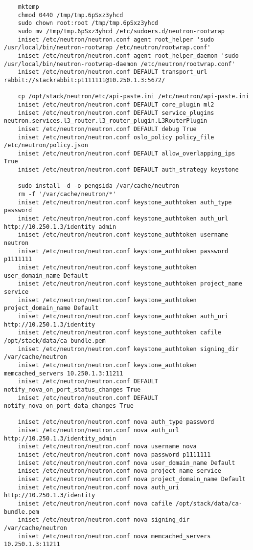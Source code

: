 \documentclass[a4paper,left=1.5cm,right=1.5cm,11pt]{article}
\begin{document}
\begin{lstlisting}
	mktemp
	chmod 0440 /tmp/tmp.6pSxz3yhcd
	sudo chown root:root /tmp/tmp.6pSxz3yhcd
	sudo mv /tmp/tmp.6pSxz3yhcd /etc/sudoers.d/neutron-rootwrap
	iniset /etc/neutron/neutron.conf agent root_helper 'sudo /usr/local/bin/neutron-rootwrap /etc/neutron/rootwrap.conf'
	iniset /etc/neutron/neutron.conf agent root_helper_daemon 'sudo /usr/local/bin/neutron-rootwrap-daemon /etc/neutron/rootwrap.conf'
	iniset /etc/neutron/neutron.conf DEFAULT transport_url rabbit://stackrabbit:p1111111@10.250.1.3:5672/

	cp /opt/stack/neutron/etc/api-paste.ini /etc/neutron/api-paste.ini
	iniset /etc/neutron/neutron.conf DEFAULT core_plugin ml2
	iniset /etc/neutron/neutron.conf DEFAULT service_plugins neutron.services.l3_router.l3_router_plugin.L3RouterPlugin
	iniset /etc/neutron/neutron.conf DEFAULT debug True
	iniset /etc/neutron/neutron.conf oslo_policy policy_file /etc/neutron/policy.json
	iniset /etc/neutron/neutron.conf DEFAULT allow_overlapping_ips True
	iniset /etc/neutron/neutron.conf DEFAULT auth_strategy keystone

	sudo install -d -o pengsida /var/cache/neutron
	rm -f '/var/cache/neutron/*'
	iniset /etc/neutron/neutron.conf keystone_authtoken auth_type password
	iniset /etc/neutron/neutron.conf keystone_authtoken auth_url http://10.250.1.3/identity_admin
	iniset /etc/neutron/neutron.conf keystone_authtoken username neutron
	iniset /etc/neutron/neutron.conf keystone_authtoken password p1111111
	iniset /etc/neutron/neutron.conf keystone_authtoken user_domain_name Default
	iniset /etc/neutron/neutron.conf keystone_authtoken project_name service
	iniset /etc/neutron/neutron.conf keystone_authtoken project_domain_name Default
	iniset /etc/neutron/neutron.conf keystone_authtoken auth_uri http://10.250.1.3/identity
	iniset /etc/neutron/neutron.conf keystone_authtoken cafile /opt/stack/data/ca-bundle.pem
	iniset /etc/neutron/neutron.conf keystone_authtoken signing_dir /var/cache/neutron
	iniset /etc/neutron/neutron.conf keystone_authtoken memcached_servers 10.250.1.3:11211
	iniset /etc/neutron/neutron.conf DEFAULT notify_nova_on_port_status_changes True
	iniset /etc/neutron/neutron.conf DEFAULT notify_nova_on_port_data_changes True

	iniset /etc/neutron/neutron.conf nova auth_type password
	iniset /etc/neutron/neutron.conf nova auth_url http://10.250.1.3/identity_admin
	iniset /etc/neutron/neutron.conf nova username nova
	iniset /etc/neutron/neutron.conf nova password p1111111
	iniset /etc/neutron/neutron.conf nova user_domain_name Default
	iniset /etc/neutron/neutron.conf nova project_name service
	iniset /etc/neutron/neutron.conf nova project_domain_name Default
	iniset /etc/neutron/neutron.conf nova auth_uri http://10.250.1.3/identity
	iniset /etc/neutron/neutron.conf nova cafile /opt/stack/data/ca-bundle.pem
	iniset /etc/neutron/neutron.conf nova signing_dir /var/cache/neutron
	iniset /etc/neutron/neutron.conf nova memcached_servers 10.250.1.3:11211


\end{lstlisting}
\end{document}
